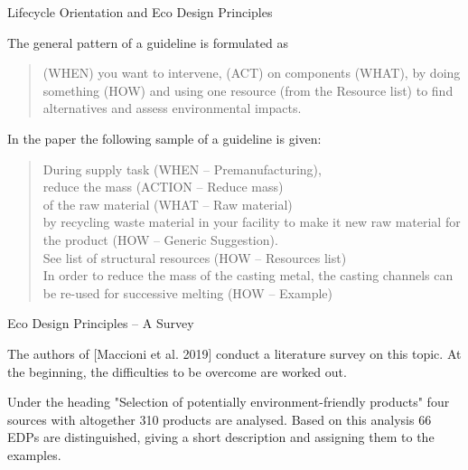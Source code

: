 \documentclass{beamer}
\begin{document}
\begin{frame}{Lifecycle Orientation and Eco Design Principles}

The general pattern of a guideline is formulated as 
\begin{quote}
  (WHEN) you want to intervene, (ACT) on components (WHAT), by doing
  something (HOW) and using one resource (from the Resource list) to find
  alternatives and assess environmental impacts.  
\end{quote}

In the paper the following sample of a guideline is given: 
\begin{quote}\small
  During supply task (WHEN -- Premanufacturing),\\ reduce the mass (ACTION --
  Reduce mass)\\ of the raw material (WHAT -- Raw material)\\ by recycling
  waste material in your facility to make it new raw material for the product
  (HOW -- Generic Suggestion). \\
  See list of structural resources (HOW -- Resources list)\\
  In order to reduce the mass of the casting metal, the casting channels can
  be re-used for successive melting (HOW -- Example) 
\end{quote}

\end{frame}

\begin{frame}{Eco Design Principles -- A Survey}

The authors of [Maccioni et al. 2019] conduct a literature survey on this topic.
At the beginning, the difficulties to be overcome are worked out.

Under the heading "Selection of potentially environment-friendly products"
four sources with altogether 310 products are analysed.  Based on this
analysis 66 EDPs are distinguished, giving a short description and assigning
them to the examples.

\end{frame}
\end{document}
